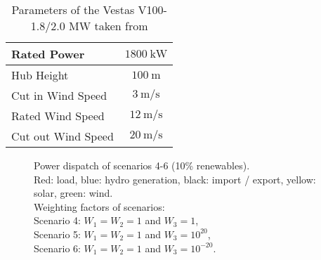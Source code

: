 \begin{table}
\centering
\begin{tabular}{|l|c|} \hline
     Rated Power & $\SI{1800}{\kW}$ \\ \hline
     Hub Height & $\SI{100}{\m}$  \\ \hline
     Cut in Wind Speed & $\SI{3}{\meter\per\second}$ \\ \hline
     Rated Wind Speed & $\SI{12}{\meter\per\second}$ \\ \hline
     Cut out Wind Speed & $\SI{20}{\meter\per\second}$ \\ \hline
\end{tabular}
\caption{Parameters of the Vestas V100-1.8/2.0 MW taken from \cite{ZHAW}}
\label{tab:wind_turbine_vestas}
\end{table}


\begin{figure}
    \centering
    \begin{subfigure}
    \texttt{[image: figures/Results/power\_dispatch\_scenario\_123.pdf]}
    \label{fig:results scenario 1-3}
    \end{subfigure}
    \centering
    \begin{subfigure}
    \texttt{[image: figures/Results/power\_dispatch\_scenario\_456.pdf]}
    \label{fig:results scenario 4-6}
    \end{subfigure}
    \caption{Power dispatch of scenarios 4-6 (10\% renewables). \\ Red: load, blue: hydro generation, black: import / export, yellow: solar, green: wind. \\ Weighting factors of scenarios: \\
    Scenario 4: $W_1 = W_2 = 1$ and $W_3 = 1$, \\
    Scenario 5: $W_1 = W_2 = 1$ and $W_3 = 10^{20}$, \\
    Scenario 6: $W_1 = W_2 = 1$ and $W_3 = 10^{-20}$. }
\end{figure}


